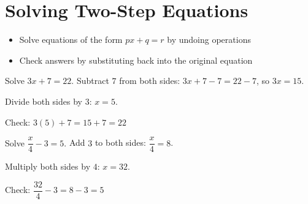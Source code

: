 \section{Solving Two-Step Equations}

\begin{stepGoal}
\begin{itemize}
    \item Solve equations of the form $px + q = r$ by undoing operations
    \item Check answers by substituting back into the original equation
\end{itemize}
\end{stepGoal}

\begin{stepVocabBox}
\end{stepVocabBox}

\begin{stepsCard}
\end{stepsCard}

\begin{stepExample}{Solve $3x + 7 = 22$.}
     Subtract $7$ from both sides: $3x + 7 - 7 = 22 - 7$, so $3x = 15$.

     Divide both sides by $3$: $x = 5$.

     Check: $3(5) + 7 = 15 + 7 = 22$ \checkmark
\end{stepExample}

\begin{stepExample}{Solve $\dfrac{x}{4} - 3 = 5$.}
     Add $3$ to both sides: $\dfrac{x}{4} = 8$.

     Multiply both sides by $4$: $x = 32$.

     Check: $\dfrac{32}{4} - 3 = 8 - 3 = 5$ \checkmark
\end{stepExample}


